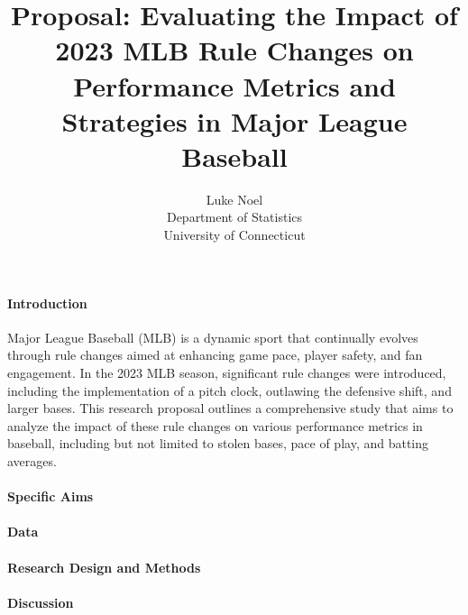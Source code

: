 \documentclass[12pt]{article}
\title{Proposal: Evaluating the Impact of 2023 MLB Rule Changes on Performance
 Metrics and Strategies in Major League Baseball}
\author{Luke Noel\\
  Department of Statistics\\
  University of Connecticut
}
\begin{document}
\maketitle


\paragraph{Introduction}
Major League Baseball (MLB) is a dynamic sport that continually evolves through 
rule changes aimed at enhancing game pace, player safety, and fan engagement. In
the 2023 MLB season, significant rule changes were introduced, including the 
implementation of a pitch clock, outlawing the defensive shift, and larger 
bases. This research proposal outlines a comprehensive study that aims to
analyze the impact of these rule changes on various performance metrics in
baseball, including but not limited to stolen bases, pace of play,
and batting averages. 

\paragraph{Specific Aims}


\paragraph{Data}


\paragraph{Research Design and Methods}



\paragraph{Discussion}





\end{document}
